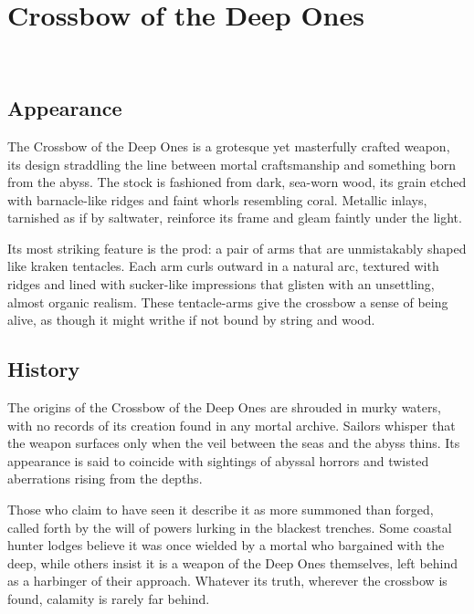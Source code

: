 \ItemCategory{}
\ItemSubCategory{}
\ItemFolder{}

\chapter*{Crossbow of the Deep Ones}
\\

%

\section*{Appearance}
{\entryfont The Crossbow of the Deep Ones is a grotesque yet masterfully crafted weapon, its design straddling the line between mortal craftsmanship and something born from the abyss. The stock is fashioned from dark, sea-worn wood, its grain etched with barnacle-like ridges and faint whorls resembling coral. Metallic inlays, tarnished as if by saltwater, reinforce its frame and gleam faintly under the light.

Its most striking feature is the prod: a pair of arms that are unmistakably shaped like kraken tentacles. Each arm curls outward in a natural arc, textured with ridges and lined with sucker-like impressions that glisten with an unsettling, almost organic realism. These tentacle-arms give the crossbow a sense of being alive, as though it might writhe if not bound by string and wood.}
\section*{History}
{\entryfont The origins of the Crossbow of the Deep Ones are shrouded in murky waters, with no records of its creation found in any mortal archive. Sailors whisper that the weapon surfaces only when the veil between the seas and the abyss thins. Its appearance is said to coincide with sightings of abyssal horrors and twisted aberrations rising from the depths.

Those who claim to have seen it describe it as more summoned than forged, called forth by the will of powers lurking in the blackest trenches. Some coastal hunter lodges believe it was once wielded by a mortal who bargained with the deep, while others insist it is a weapon of the Deep Ones themselves, left behind as a harbinger of their approach. Whatever its truth, wherever the crossbow is found, calamity is rarely far behind.}
\vfill\eject
